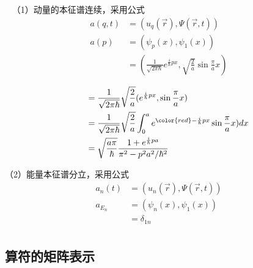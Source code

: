 \begin{frame} [allowframebreaks=]
    \解~ （1）动量的本征谱连续，采用公式\\
    \begin{equation*}
        \begin{split}
            a(q,t)&=(u_q(\vec{r}), \Psi(\vec{r},t)) \\
            a(p)&= (\psi_{p}(x), \psi_1(x))\\
            &= (\frac{1}{\sqrt{2\pi\hbar}}e^{\frac{i}{\hbar}px}, \sqrt{\frac{2}{a}} \sin \frac{\pi}{a}x)
        \end{split} 
    \end{equation*}

    \begin{equation*}
        \begin{split}
          ~~~~~~&= \frac{1}{\sqrt{2\pi\hbar}}\sqrt{\frac{2}{a}} (e^{\frac{i}{\hbar}px},  \sin \frac{\pi}{a}x)\\
            &= \frac{1}{\sqrt{2\pi\hbar}}\sqrt{\frac{2}{a}} \int_0 ^a e^{{\color{red}-}\frac{i}{\hbar}px}\sin \frac{\pi}{a}x) dx\\
            &=\sqrt{\frac{a\pi}{\hbar}} \frac{1+e^{\frac{i}{\hbar}pa}}{\pi^2-p^2a^2/\hbar^2}
        \end{split} 
    \end{equation*}

    （2）能量本征谱分立，采用公式\\
    \begin{equation*}
        \begin{split}
            a_n(t)&=(u_n(\vec{r}), \Psi(\vec{r},t)) \\
            a_{E_n}&=(\psi_n(x), \psi_1(x)) \\
            &=\delta_{1n} \\
        \end{split} 
    \end{equation*}  
\end{frame} 

\subsection{算符的矩阵表示}

